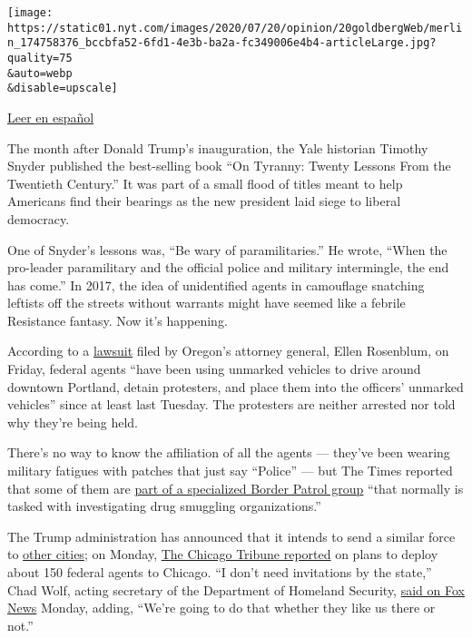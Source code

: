 \texttt{[image: https://static01.nyt.com/images/2020/07/20/opinion/20goldbergWeb/merlin\_174758376\_bccbfa52-6fd1-4e3b-ba2a-fc349006e4b4-articleLarge.jpg?quality=75\\\&auto=webp\\\&disable=upscale]}

\href{https://www.nytimes.com/es/2020/07/22/espanol/opinion/portland-protestas-trump.html}{Leer
en español}

The month after Donald Trump's inauguration, the Yale historian Timothy
Snyder published the best-selling book ``On Tyranny: Twenty Lessons From
the Twentieth Century.'' It was part of a small flood of titles meant to
help Americans find their bearings as the new president laid siege to
liberal democracy.

One of Snyder's lessons was, ``Be wary of paramilitaries.'' He wrote,
``When the pro-leader paramilitary and the official police and military
intermingle, the end has come.'' In 2017, the idea of unidentified
agents in camouflage snatching leftists off the streets without warrants
might have seemed like a febrile Resistance fantasy. Now it's happening.

According to a
\href{http://opb-imgserve-production.s3-website-us-west-2.amazonaws.com/original/ag_rosenblum_xxxx_updated_complaint_1595086491349.pdf}{lawsuit}
filed by Oregon's attorney general, Ellen Rosenblum, on Friday, federal
agents ``have been using unmarked vehicles to drive around downtown
Portland, detain protesters, and place them into the officers' unmarked
vehicles'' since at least last Tuesday. The protesters are neither
arrested nor told why they're being held.

There's no way to know the affiliation of all the agents --- they've
been wearing military fatigues with patches that just say ``Police'' ---
but The Times reported that some of them are
\href{https://www.nytimes.com/2020/07/18/us/portland-protests.html}{part
of a specialized Border Patrol group} ``that normally is tasked with
investigating drug smuggling organizations.''

The Trump administration has announced that it intends to send a similar
force to
\href{https://www.motherjones.com/anti-racism-police-protest/2020/07/trump-border-patrol-cities-portland-chicago/}{other
cities}; on Monday,
\href{https://www.chicagotribune.com/news/criminal-justice/ct-chicago-police-dhs-deployment-20200720-dftu5ychwbcxtg4ltarh5qnwma-story.html}{The
Chicago Tribune reported} on plans to deploy about 150 federal agents to
Chicago. ``I don't need invitations by the state,'' Chad Wolf, acting
secretary of the Department of Homeland Security,
\href{https://twitter.com/atrupar/status/1285224329878306817?s=20}{said
on Fox News} Monday, adding, ``We're going to do that whether they like
us there or not.''

